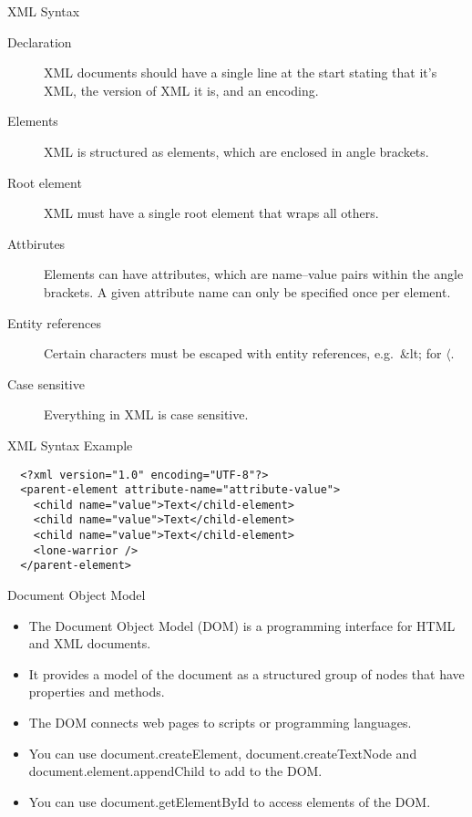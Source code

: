 \begin{frame}{XML Syntax}
  \begin{description}
    \item[Declaration] XML documents should have a single line at the start stating that it's XML, the version of XML it is, and an encoding.
    \item[Elements] XML is structured as elements, which are enclosed in angle brackets.
    \item[Root element] XML must have a single root element that wraps all others.
    \item[Attbirutes] Elements can have attributes, which are name--value pairs within the angle brackets. A given attribute name can only be specified once per element.
    \item[Entity references] Certain characters must be escaped with entity references, e.g.\ \&lt; for $\langle$.
    \item[Case sensitive] Everything in XML is case sensitive.
  \end{description}
\end{frame}

\begin{frame}[fragile]{XML Syntax Example}
  \begin{verbatim}
  <?xml version="1.0" encoding="UTF-8"?>
  <parent-element attribute-name="attribute-value">
    <child name="value">Text</child-element>
    <child name="value">Text</child-element>
    <child name="value">Text</child-element>
    <lone-warrior />
  </parent-element>
  \end{verbatim}
\end{frame}

\begin{frame}{Document Object Model}
  \begin{itemize}
    \item The Document Object Model (DOM) is a programming interface for HTML and XML documents.
    \item It provides a model of the document as a structured group of nodes that have properties and methods.
    \item The DOM connects web pages to scripts or programming languages.
    \item You can use document.createElement, document.createTextNode and document.element.appendChild to add to the DOM.
    \item You can use document.getElementById to access elements of the DOM.
  \end{itemize}
\end{frame}


